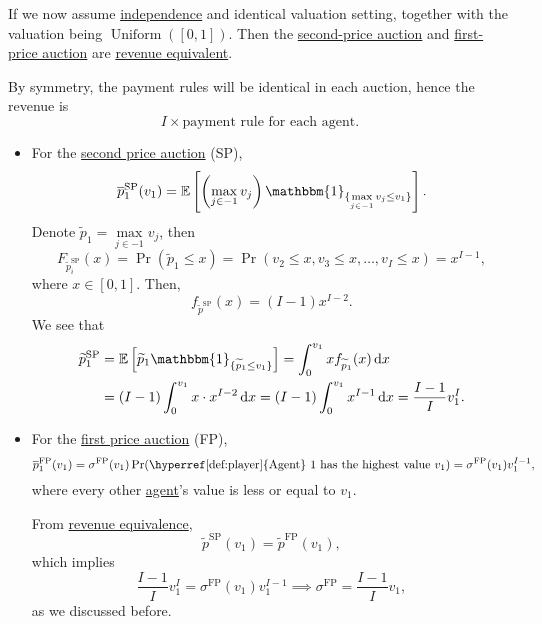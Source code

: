 If we now assume \hyperref[def:independent]{independence} and identical valuation setting, together with the valuation being \(\operatorname{Uniform}([0,1])\). Then the \hyperref[eg:second-price-auction]{second-price auction} and \hyperref[eg:first-price-auction]{first-price auction} are \hyperref[rmk:revenue-equivalence]{revenue equivalent}.

By symmetry, the payment rules will be identical in each auction, hence the revenue is
\[
	I\times \text{payment rule for each agent}.
\]

\begin{itemize}
	\item For the \hyperref[eg:second-price-auction]{second price auction} (SP),
	      \[
		      \overline{p}_1^{\mathrm{SP}}(v_1) = \mathbb{E}\left[\left(\max_{j\in -1}v_{j}\right)\mathbbm{1}_{\{ \max\limits_{j\in -1} v_{j}\leq v_1\}}  \right] .
	      \]
	      Denote \(\widetilde{p}_1 = \max\limits_{j\in -1} v_{j}\), then
	      \[
		      F_{\widetilde{p}^{\mathrm{SP}}_i}(x) = \Pr(\widetilde{p}_1\leq x) = \Pr(v_2\leq x, v_3\leq x, \dots , v_I\leq x) = x^{I-1},
	      \]
	      where \(x\in [0, 1]\). Then,
	      \[
		      f_{\widetilde{p}^{\mathrm{SP}}}(x) = (I - 1)x^{I-2}.
	      \]
	      We see that
	      \[
		      \begin{split}
			      \widetilde{p}_1^{\mathrm{SP}} & = \mathbb{E}\left[\widetilde{p}_{1}\mathbbm{1}_{\{ \widetilde{p}_1\leq v_1 \}} \right]
			      =\int_0^{v_1} xf_{\widetilde{p}_1}(x)\,\mathrm{d}x                                                                     \\
			                                    & = (I - 1)\int_0^{v_1}x\cdot x^{I-2}\,\mathrm{d}x
			      = (I - 1)\int_0^{v_1}x^{I-1}\,\mathrm{d}x
			      = \frac{I-1}{I}v_1^I.
		      \end{split}
	      \]
	\item For the \hyperref[eg:first-price-auction]{first price auction} (FP),
	      \[
		      \overline{p}_1^{\mathrm{FP}}(v_1)
		      = \sigma^{\mathrm{FP}}(v_1)\Pr(\text{\hyperref[def:player]{Agent} 1 has the highest value \(v_1\)})
		      = \sigma^{\mathrm{FP}}(v_1)v_1^{I-1},
	      \]
	      where every other \hyperref[def:player]{agent}'s value is less or equal to \(v_1\).

	      From \hyperref[rmk:revenue-equivalence]{revenue equivalence},
	      \[
		      \widetilde{p}^{\mathrm{SP}}(v_1) = \widetilde{p}^{\mathrm{FP}}(v_1),
	      \]
	      which implies
	      \[
		      \frac{I-1}{I}v_{1}^I = \sigma^{\mathrm{FP}}(v_1)v_1^{I-1} \implies \sigma^{\mathrm{FP}} = \frac{I-1}{I}v_1,
	      \]
	      as we discussed before.
\end{itemize}

